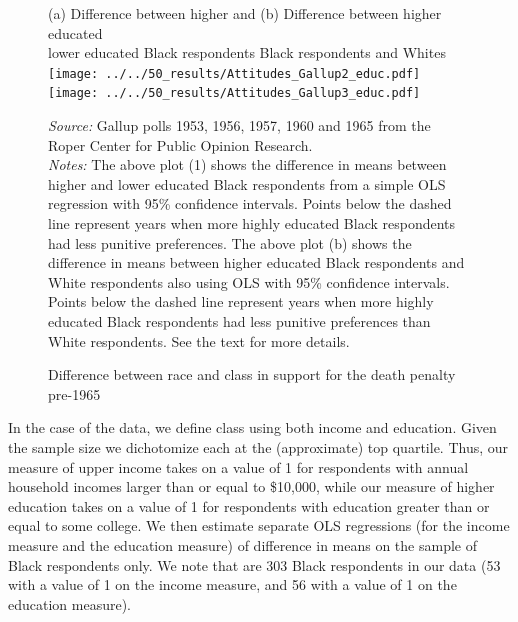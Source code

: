 \documentclass[12pt]{article}
\begin{document}
\begin{figure}[h!]
 \begin{center}
 \caption{Difference between race and class in support for the death penalty pre-1965}
 \smallskip \smallskip
 \small
		(a) Difference between higher and   \hspace*{1.2in} (b) Difference between higher educated \\
		lower educated Black respondents \hspace*{1.2in}  Black respondents and Whites \\

			\texttt{[image: ../../50\_results/Attitudes\_Gallup2\_educ.pdf]}
			\texttt{[image: ../../50\_results/Attitudes\_Gallup3\_educ.pdf]}
			\label{figure_attitudes_gallup2}
			 \end{center}
{\scriptsize{\emph{Source:} Gallup polls 1953, 1956, 1957, 1960 and 1965 from the Roper Center for Public Opinion Research.  }} \\
{\scriptsize{\emph{Notes:} The above plot (1) shows the difference in means between higher and lower educated Black respondents from a simple OLS regression with 95\% confidence intervals.  Points below the dashed line represent years when more highly educated Black respondents had less punitive preferences. The above plot (b) shows the difference in means between higher educated Black respondents and White respondents also using OLS with 95\% confidence intervals.  Points below the dashed line represent years when more highly educated Black respondents had less punitive preferences than White respondents.  See the text for more details. \singlespacing }}
			\end{figure} \normalsize


In the case of the \cite{Violence1969} data, we define class using both income and education.  Given the sample size we dichotomize each at the (approximate) top quartile. Thus, our measure of upper income takes on a value of 1 for respondents with annual household incomes larger than or equal to \$10,000, while our measure of higher education takes on a value of 1 for respondents with education greater than or equal to some college.  We then estimate separate OLS regressions (for the income measure and the education measure) of difference in means on the sample of Black respondents only.  We note that are 303 Black respondents in our data (53 with a value of 1 on the income measure, and 56 with a value of 1 on the education measure).
\end{document}
